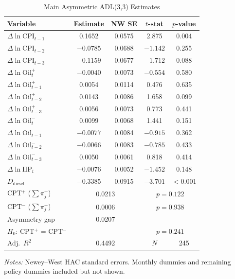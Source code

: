 \begin{table}[H]
\centering
\caption{Main Asymmetric ADL(3,3) Estimates}
\label{tab:asymmetric}
\begin{tabular}{lcccc}
\toprule
\textbf{Variable} & \textbf{Estimate} & \textbf{NW SE} & \textbf{$t$-stat} & \textbf{$p$-value} \\
\midrule
$\Delta\ln\text{CPI}_{t-1}$ & 0.1652 & 0.0575 & 2.875 & 0.004 \\
$\Delta\ln\text{CPI}_{t-2}$ & $-0.0785$ & 0.0688 & $-1.142$ & 0.255 \\
$\Delta\ln\text{CPI}_{t-3}$ & $-0.1159$ & 0.0677 & $-1.712$ & 0.088 \\
\midrule
$\Delta\ln\text{Oil}^+_t$ & $-0.0040$ & 0.0073 & $-0.554$ & 0.580 \\
$\Delta\ln\text{Oil}^+_{t-1}$ & 0.0054 & 0.0114 & 0.476 & 0.635 \\
$\Delta\ln\text{Oil}^+_{t-2}$ & 0.0143 & 0.0086 & 1.658 & 0.099 \\
$\Delta\ln\text{Oil}^+_{t-3}$ & 0.0056 & 0.0073 & 0.773 & 0.441 \\
\midrule
$\Delta\ln\text{Oil}^-_t$ & 0.0099 & 0.0068 & 1.441 & 0.151 \\
$\Delta\ln\text{Oil}^-_{t-1}$ & $-0.0077$ & 0.0084 & $-0.915$ & 0.362 \\
$\Delta\ln\text{Oil}^-_{t-2}$ & $-0.0066$ & 0.0083 & $-0.785$ & 0.433 \\
$\Delta\ln\text{Oil}^-_{t-3}$ & 0.0050 & 0.0061 & 0.818 & 0.414 \\
\midrule
$\Delta\ln\text{IIP}_t$ & $-0.0076$ & 0.0052 & $-1.452$ & 0.148 \\
$D_{\text{diesel}}$ & $-0.3385$ & 0.0915 & $-3.701$ & $<0.001$ \\
\midrule
CPT$^+$ ($\sum \pi^+_j$) & \multicolumn{2}{c}{0.0213} & \multicolumn{2}{c}{$p = 0.122$} \\
CPT$^-$ ($\sum \pi^-_j$) & \multicolumn{2}{c}{0.0006} & \multicolumn{2}{c}{$p = 0.938$} \\
Asymmetry gap & \multicolumn{2}{c}{0.0207} & & \\
$H_0$: CPT$^+$ = CPT$^-$ & & & \multicolumn{2}{c}{$p = 0.241$} \\
Adj.\ $R^2$ & \multicolumn{2}{c}{0.4492} & $N$ & 245 \\
\bottomrule
\end{tabular}
\begin{flushleft}
\vspace{0.3em}
\small\textit{Notes:} Newey--West HAC standard errors. Monthly dummies and remaining policy dummies included but not shown.
\end{flushleft}
\end{table}

